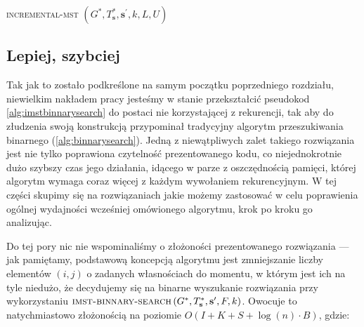 {\begin{pseudokod}
{{		}
	}
	\caption{\textsc{incremental-mst} $\left( G^{\ast}, T^{\ast}_{\textbf{s}}, \textbf{s}^{\prime}, k, L, U \right)$}
	\label{alg:imstbinnarysearch}
\end{pseudokod}

\subsection{Lepiej, szybciej}

Tak jak to zostało podkreślone na samym początku poprzedniego rozdziału, niewielkim nakładem pracy jesteśmy w stanie przekształcić pseudokod \ref{alg:imstbinnarysearch} do postaci nie korzystającej z rekurencji, tak aby do złudzenia swoją konstrukcją przypominał tradycyjny algorytm przeszukiwania binarnego (\ref{alg:binnarysearch}). Jedną z niewątpliwych zalet takiego rozwiązania jest nie tylko poprawiona czytelność prezentowanego kodu, co niejednokrotnie dużo szybszy czas jego działania, idącego w parze z oszczędnością pamięci, której algorytm wymaga coraz więcej z każdym wywołaniem rekurencyjnym. W tej części skupimy się na rozwiązaniach jakie możemy zastosować w celu poprawienia ogólnej wydajności wcześniej omówionego algorytmu, krok po kroku go analizując.

Do tej pory nic nie wspominaliśmy o złożoności prezentowanego rozwiązania --- jak pamiętamy, podstawową koncepcją algorytmu jest zmniejszanie liczby elementów $\left( i, j \right)$ o zadanych własnościach do momentu, w którym jest ich na tyle niedużo, że decydujemy się na binarne wyszukanie rozwiązania przy wykorzystaniu $\textsc{imst-binnary-search} \left( G^{\ast}, T^{\ast}_{\textbf{s}}, \textbf{s}^{\prime}, F, k \right)$. Owocuje to natychmiastowo złożonością na poziomie $O \left( I + K + S + \log \left( n \right) \cdot B \right)$, gdzie:

}
